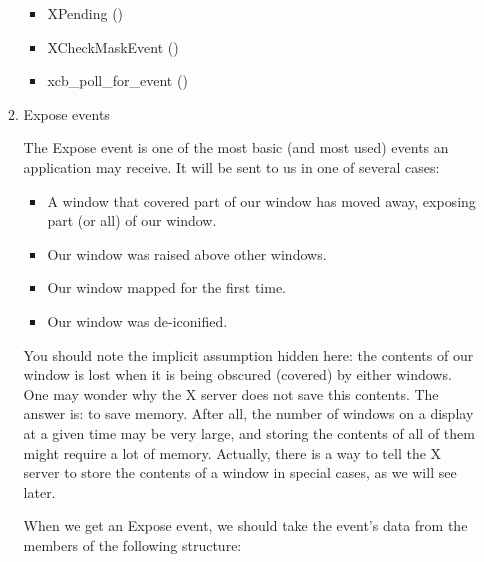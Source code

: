 \documentclass[12pt,oneside,titlepage]{book}
\providecommand{\tightlist}{%
  \setlength{\itemsep}{0pt}\setlength{\parskip}{0pt}}
\begin{document}
\begin{enumerate}
\begin{enumerate}
    \begin{itemize}
    \tightlist
    \item
      XPending ()
    \item
      XCheckMaskEvent ()
    \end{itemize}

    \begin{itemize}
    \tightlist
    \item
      xcb\_poll\_for\_event ()
    \end{itemize}

    \hfill\break
  \item
    \protect\hypertarget{expose}{}{Expose events}

    The {Expose} event is one of the most basic (and most used) events
    an application may receive. It will be sent to us in one of several
    cases:

    \begin{itemize}
    \tightlist
    \item
      A window that covered part of our window has moved away, exposing
      part (or all) of our window.
    \item
      Our window was raised above other windows.
    \item
      Our window mapped for the first time.
    \item
      Our window was de-iconified.
    \end{itemize}

    You should note the implicit assumption hidden here: the contents of
    our window is lost when it is being obscured (covered) by either
    windows. One may wonder why the X server does not save this
    contents. The answer is: to save memory. After all, the number of
    windows on a display at a given time may be very large, and storing
    the contents of all of them might require a lot of memory. Actually,
    there is a way to tell the X server to store the contents of a
    window in special cases, as we will see later.

    When we get an {Expose} event, we should take the event's data from
    the members of the following structure:


\end{enumerate}
\end{enumerate}
\end{document}
